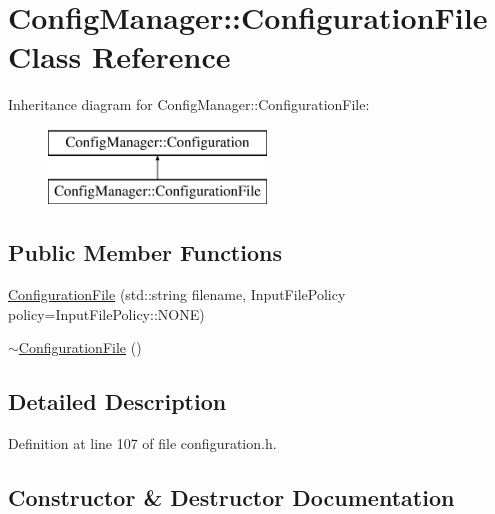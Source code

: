 \hypertarget{class_config_manager_1_1_configuration_file}{}\section{Config\+Manager\+:\+:Configuration\+File Class Reference}
\label{class_config_manager_1_1_configuration_file}
Inheritance diagram for Config\+Manager\+:\+:Configuration\+File\+:\begin{figure}[H]
\begin{center}
\leavevmode
\includegraphics[height=2.000000cm]{class_config_manager_1_1_configuration_file}
\end{center}
\end{figure}
\subsection*{Public Member Functions}
\begin{DoxyCompactItemize}
\item 
\hyperlink{class_config_manager_1_1_configuration_file_a07d5355e097215f22a31f8e3e1d73aae}{Configuration\+File} (std\+::string filename, Input\+File\+Policy policy=Input\+File\+Policy\+::\+N\+O\+NE)
\item 
\hyperlink{class_config_manager_1_1_configuration_file_ab58c1860cb0d3b502f674975000736a5}{$\sim$\+Configuration\+File} ()
\end{DoxyCompactItemize}


\subsection{Detailed Description}


Definition at line 107 of file configuration.\+h.



\subsection{Constructor \& Destructor Documentation}
